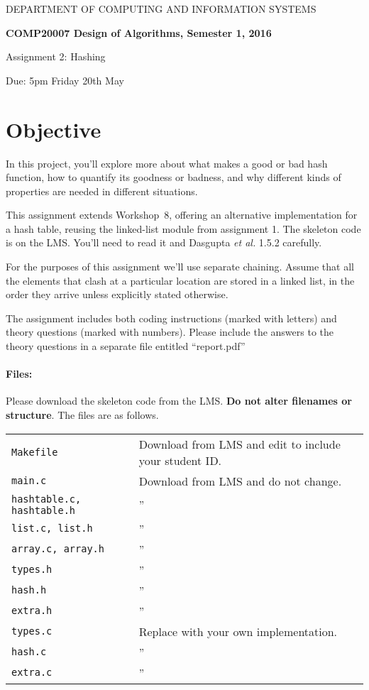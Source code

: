 \documentclass[11pt]{article}
\title{}
\date{}
\begin{document}
{\large
\begin{center}
DEPARTMENT OF COMPUTING AND INFORMATION SYSTEMS\vspace{2ex}

{\Large\bf
COMP20007 Design of Algorithms, Semester 1, 2016

Assignment 2: Hashing
}\vspace{2ex}

Due: 5pm Friday 20th May
\end{center}
}

\section*{Objective}
In this project, you'll explore more about what makes a good or bad hash function,
how to quantify its goodness or badness,
and why different kinds of properties are needed in different situations.

This assignment extends Workshop~8,
offering an alternative implementation for a hash table,
reusing the linked-list module from assignment 1.
The skeleton code is on the LMS\@.
You'll need to read it and Dasgupta {\it et al.} \/1.5.2 carefully.

For the purposes of this assignment we'll use separate chaining.
Assume that all the elements that clash at a particular location are stored in a linked list,
in the order they arrive unless explicitly stated otherwise.

The assignment includes both coding instructions
(marked with letters)
and theory questions (marked with numbers).
Please include the answers to the theory questions in a separate file entitled ``report.pdf''

\paragraph{Files:}
Please download the skeleton code from the LMS\@.
{\bf Do not alter filenames or structure}.
The files are as follows.

\begin{center}
\begin{tabular}{ll}
\toprule
\texttt{Makefile} & Download from LMS and edit to include your student ID.\\
\texttt{main.c} & Download from LMS and do not change.\\
\texttt{hashtable.c, hashtable.h} & '' \\
\texttt{list.c, list.h} & '' \\
\texttt{array.c, array.h} & '' \\
\texttt{types.h} & '' \\
\texttt{hash.h} & '' \\
\texttt{extra.h} & '' \\
\midrule
\texttt{types.c} & Replace with your own implementation.\\
\texttt{hash.c} & '' \\
\texttt{extra.c} & '' \\
\bottomrule
\end{tabular}
\end{center}
\end{document}
